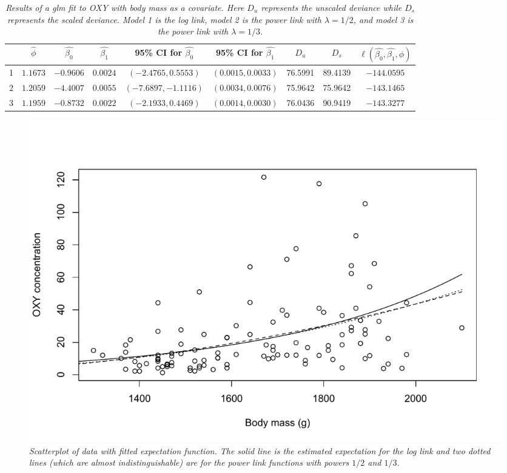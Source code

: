 \documentclass[12pt]{article}
\begin{document}
\begin{enumerate}
    \begin{table}[h]
      \caption{\emph{Results of a glm fit to OXY with body mass as a covariate. Here $D_{u}$ represents the unscaled deviance while $D_{s}$ represents the
      scaled deviance. Model 1 is the log link, model 2 is the power link with $\lambda = 1/2$, and model 3 is the power link with $\lambda = 1/3$.}}
      \vspace{.5cm}
      \centering
      \begin{tabular}{|l|c|c|c|c|c|c|c|c|}
        \hline
        & $\hat{\phi}$ & $\hat{\beta_0}$ & $\hat{\beta_{1}}$ & 95\% CI for $\hat{\beta_0}$ & 95\% CI for $\hat{\beta_1}$ & $D_{u}$ & $D_{s}$ &
        $\ell(\hat{\beta_0}, \hat{\beta_1}, \hat{\phi})$ \\
        \hline
        1 & $1.1673$ & $-0.9606$ & $0.0024$ & $(-2.4765, 0.5553)$ & $(0.0015, 0.0033)$ & 76.5991 & 89.4139 & $-144.0595$ \\
        \hline
        2 & $1.2059$ & $-4.4007$ & $0.0055$ & $(-7.6897, -1.1116)$ & $(0.0034, 0.0076)$ & 75.9642 & 75.9642 & $-143.1465$ \\
        \hline
        3 & $1.1959$ & $-0.8732$ & $0.0022$ & $(-2.1933, 0.4469)$ & $(0.0014, 0.0030)$ & 76.0436 & 90.9419 & $-143.3277$ \\
        \hline
      \end{tabular}
      \label{tab:1}
    \end{table}


    \vspace{5cm}


    \begin{figure}[h]
      \centering
      \includegraphics[width=.8\textwidth]{./figures/hw03_fitted.pdf}
      \caption{\emph{Scatterplot of data with fitted expectation function. The solid line is the
          estimated expectation for the log link and two dotted lines (which are almost indistinguishable) are for the power link functions with powers $1/2$
      and $1/3$.}}
      \label{fig:5}
    \end{figure}
\end{enumerate}
\end{document}
